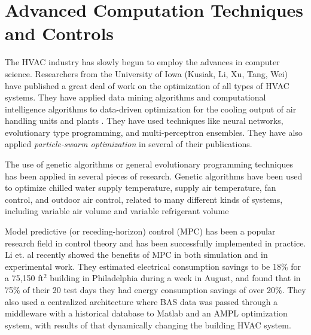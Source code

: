 \section{Advanced Computation Techniques and Controls}

The HVAC industry has slowly begun to employ the advances in computer science. Researchers from the University of Iowa (Kusiak, Li, Xu, Tang, Wei) have published a great deal of work on the optimization of all types of HVAC systems. They have applied data mining algorithms and computational intelligence algorithms to data-driven optimization for the cooling output of air handling units and plants \cite{Kusiak2014MinimizationOfEnergyConsumptionInHVAC, HeXiaofei2014, Kusiak2013MinimizingEnergyConsumption, Kusiak2012ModelingAndOptimizationOfHVAC, Kusiak2011MultiObjective, Kusiak2010ReheatBox, WeiXiupeng2015, WeiXiupeng2014ModelingAndOptimizationOfAChillerPlant, Kusiak2010, Kusiak2010ModelingAndOptimization, Kusiak2011OptimizationOfAnHVACSystemWithAStrength}. They have used techniques like neural networks, evolutionary type programming, and multi-perceptron ensembles. They have also applied \textit{particle-swarm optimization} in several of their publications. 

The use of genetic algorithms or general evolutionary programming techniques has been applied in several pieces of research. Genetic algorithms have been used to optimize chilled water supply temperature, supply air temperature, fan control, and outdoor air control, related to many different kinds of systems, including variable air volume and variable refrigerant volume \cite{Fong2006HVACProgramming,Jin2005Prediction-basedSystems,Parameshwaran2010EnergyAlgorithm,Congradac2009HVACAlgorithms}

Model predictive (or receding-horizon) control (MPC) has been a popular research field in control theory and has been successfully implemented in practice. Li et. al \cite{Li2015SimulationSystem} recently showed the benefits of MPC in both simulation and in experimental work. They estimated electrical consumption savings to be 18\% for a 75,150 ft\(^2\) building in Philadelphia during a week in August, and found that in 75\% of their 20 test days they had energy consumption savings of over 20\%. They also used a centralized architecture where BAS data was passed through a middleware with a historical database to Matlab and an AMPL optimization system, with results of that dynamically changing the building HVAC system.

